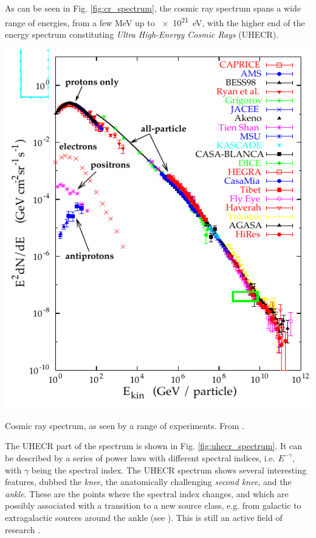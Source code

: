 \documentclass[
    a4paper, %
    fontsize=10pt, %
    twoside=false, %
    numbers=noenddot, %
    fontmethod=tex,
]{kaobook}
\begin{document}
As can be seen in Fig. \ref{fig:cr_spectrum}, the cosmic ray spectrum spans a wide range of energies, from a few \unit{\mega\eV} up to \SI{e21}{\eV}, with the higher end of the energy spectrum constituting \textit{Ultra High-Energy Cosmic Rays} (UHECR).

\begin{marginfigure}
    \includegraphics{theory/cr_spectrum.pdf}
    \caption[Cosmic ray spectrum]{Cosmic ray spectrum, as seen by a range of experiments. From \cite{Hillas2006}.}
\end{marginfigure}

The UHECR part of the spectrum is shown in Fig. \ref{fig:uhecr_spectrum}. It can be described by a series of power laws with different spectral indices, i.e. $E^{-\gamma}$, with $\gamma$ being the spectral index. The UHECR spectrum shows several interesting features, dubbed the \textit{knee}, the anatomically challenging \textit{second knee}, and the \textit{ankle}. These are the points where the spectral index changes, and which are possibly associated with a transition to a new source class, e.g. from galactic to extragalactic sources around the ankle (see ). This is still an active field of research \cite{Workman2022}.
\end{document}
